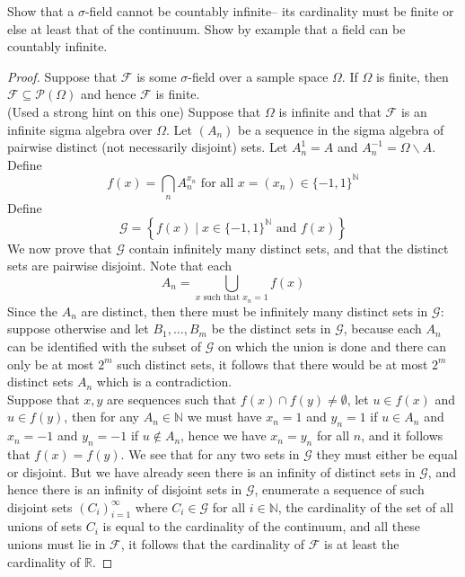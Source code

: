 \documentclass[11pt]{article}
\newcommand{\N}{\mathbb{N}}
\newcommand{\R}{\mathbb{R}}
\newcommand{\F}{\mathcal{F}}
\newcommand{\G}{\mathcal{G}}
\newcommand{\seq}{\subseteq}
\newcommand{\Om}{\Omega}
\newcommand{\es}{\emptyset}
\newcommand{\mc}{\mathcal}
\newcommand{\ic}{\cap}
\newenvironment{exercise}[2][Exercise]{\begin{trivlist}
\item[\hskip \labelsep {\bfseries #1}\hskip \labelsep {\bfseries #2.}]}{\end{trivlist}}
\begin{document}
\begin{exercise}{2.12}
    Show that a $\sigma$-field cannot be countably infinite-- its cardinality must be finite or else at least that of the continuum. Show by example that a field can be countably infinite.
\end{exercise}
\begin{proof}
    Suppose that $\F$ is some $\sigma$-field over a sample space $\Om$. If $\Om$ is finite, then $\F \seq \mc P (\Om)$ and hence $\F$ is finite. \\
    (Used a strong hint on this one) Suppose that $\Om$ is infinite and that $\F$ is an infinite sigma algebra over $\Om$. Let $(A_n)$ be a sequence in the sigma algebra of pairwise distinct (not necessarily disjoint) sets. Let $A_{n}^{1} = A$ and $A_{n}^{-1} = \Om \backslash A$. Define 
    \[ f(x) = \bigcap_{n} A_{n}^{x_n} \text { for all } x = (x_{n}) \in \{ -1, 1 \}^{\N} \]
    Define
    \[ \G = \left \{ f(x) \mid x \in \{ -1, 1 \}^{\N} \text { and } f(x) \right \} \]
    We now prove that $\G$ contain infinitely many distinct sets, and that the distinct sets are pairwise disjoint. Note that each 
    \[ A_{n} = \bigcup_{x \text{ such that } x_n = 1} f(x) \]
    Since the $A_{n}$ are distinct, then there must be infinitely many distinct sets in $\G$: suppose otherwise and let $B_1, \ldots, B_{m}$ be the distinct sets in $\G$, because each $A_n$ can be identified with the subset of $\G$ on which the union is done and there can only be at most $2^{m}$ such distinct sets, it follows that there would be at most $2^{m}$ distinct sets $A_n$ which is a contradiction. \\
    Suppose that $x, y$ are sequences such that $f(x) \ic f(y) \neq \es$, let $u \in f(x)$ and $u \in f(y)$, then for any $A_{n} \in \N$ we must have $x_n = 1$ and $y_n = 1$ if $u \in A_n$ and $x_n = -1$ and $y_n = -1$ if $u \notin A_n$, hence we have $x_n = y_n$ for all $n$, and it follows that $f(x) = f(y)$. We see that for any two sets in $\G$ they must either be equal or disjoint. But we have already seen there is an infinity of distinct sets in $\G$, and hence there is an infinity of disjoint sets in $\G$, enumerate a sequence of such disjoint sets $(C_i)_{i=1}^{\infty}$ where $C_{i} \in \G$ for all $i \in \N$, the cardinality of the set of all unions of sets $C_{i}$ is equal to the cardinality of the continuum, and all these unions must lie in $\F$, it follows that the cardinality of $\F$ is at least the cardinality of $\R$.
\end{proof}
\end{document}
